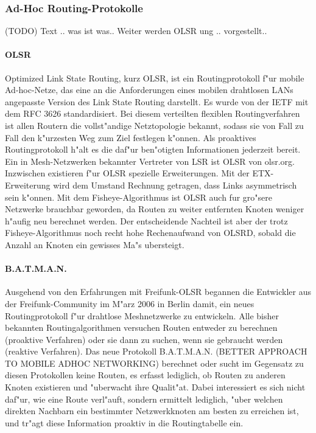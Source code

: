 \subsubsection{Ad-Hoc Routing-Protokolle}
(TODO) Text .. was ist was.. 
Weiter werden OLSR ung .. vorgestellt..

\paragraph{OLSR}

Optimized Link State Routing, kurz OLSR, ist ein Routingprotokoll
f"ur mobile Ad-hoc-Netze, das eine an die Anforderungen eines mobilen
drahtlosen LANs angepasste Version des Link State Routing darstellt. Es
wurde von der IETF mit dem RFC 3626 standardisiert. Bei diesem
verteilten flexiblen Routingverfahren ist allen Routern die vollst"andige
Netztopologie bekannt, sodass sie von Fall zu Fall den k"urzesten Weg zum
Ziel festlegen k"onnen. Als proaktives Routingprotokoll h"alt es die daf"ur
ben"otigten Informationen jederzeit bereit. Ein in Mesh-Netzwerken
bekannter Vertreter von LSR ist OLSR von olsr.org. Inzwischen existieren
f"ur OLSR spezielle Erweiterungen. Mit der ETX-Erweiterung wird dem
Umstand Rechnung getragen, dass Links asymmetrisch sein k"onnen. Mit
dem Fisheye-Algorithmus ist OLSR auch fur gro"sere Netzwerke brauchbar
geworden, da Routen zu weiter entfernten Knoten weniger h"aufig neu
berechnet werden. Der entscheidende Nachteil ist aber der trotz
Fisheye-Algorithmus noch recht hohe Rechenaufwand von OLSRD, sobald
die Anzahl an Knoten ein gewisses Ma"s ubersteigt.

\paragraph{B.A.T.M.A.N.}

Ausgehend von den Erfahrungen mit Freifunk-OLSR begannen die Entwickler
aus der Freifunk-Community im M"arz 2006 in Berlin damit, ein neues
Routingprotokoll f"ur drahtlose Meshnetzwerke zu entwickeln. Alle bisher
bekannten Routingalgorithmen versuchen Routen entweder zu berechnen
(proaktive Verfahren) oder sie dann zu suchen, wenn sie gebraucht werden
(reaktive Verfahren). Das neue Protokoll B.A.T.M.A.N. 
(BETTER APPROACH TO MOBILE ADHOC NETWORKING) berechnet oder
sucht im Gegensatz zu diesen Protokollen keine Routen, es erfasst
lediglich, ob Routen zu anderen Knoten existieren und "uberwacht ihre
Qualit"at. Dabei interessiert es sich nicht daf"ur, wie eine Route verl"auft,
sondern ermittelt lediglich, "uber welchen direkten Nachbarn ein bestimmter
Netzwerkknoten am besten zu erreichen ist, und tr"agt diese Information
proaktiv in die Routingtabelle ein. 

